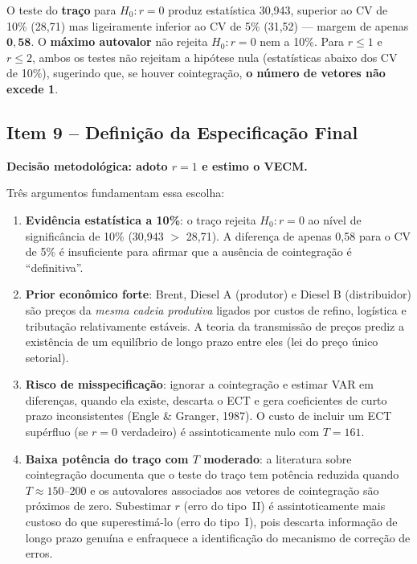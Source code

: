 \documentclass[12pt,a4paper]{article}
\begin{document}
\noindent
O teste do \textbf{traço} para $H_0: r = 0$ produz estatística 30,943,
superior ao CV de 10\% (28,71) mas ligeiramente inferior ao CV de 5\%
(31,52) --- margem de apenas $\mathbf{0{,}58}$.
O \textbf{máximo autovalor} não rejeita $H_0: r = 0$ nem a 10\%.
Para $r \le 1$ e $r \le 2$, ambos os testes não rejeitam a hipótese nula
(estatísticas abaixo dos CV de 10\%), sugerindo que, se houver cointegração,
\textbf{o número de vetores não excede 1}.

\subsection{Item 9 -- Definição da Especificação Final}

\textbf{Decisão metodológica: adoto $r = 1$ e estimo o VECM.}

\medskip\noindent
Três argumentos fundamentam essa escolha:
\begin{enumerate}
  \item \textbf{Evidência estatística a 10\%}: o traço rejeita $H_0: r = 0$
        ao nível de significância de 10\% (30,943 $>$ 28,71).
        A diferença de apenas 0,58 para o CV de 5\% é insuficiente para
        afirmar que a ausência de cointegração é ``definitiva''.
  \item \textbf{Prior econômico forte}: Brent, Diesel A (produtor) e Diesel B
        (distribuidor) são preços da \emph{mesma cadeia produtiva} ligados por
        custos de refino, logística e tributação relativamente estáveis.
        A teoria da transmissão de preços prediz a existência de um equilíbrio
        de longo prazo entre eles (lei do preço único setorial).
  \item \textbf{Risco de misspecificação}: ignorar a cointegração e estimar
        VAR em diferenças, quando ela existe, descarta o ECT e gera
        coeficientes de curto prazo inconsistentes (Engle \& Granger, 1987).
        O custo de incluir um ECT supérfluo (se $r = 0$ verdadeiro) é
        assintoticamente nulo com $T = 161$.
  \item \textbf{Baixa potência do traço com $T$ moderado}: a literatura
        sobre cointegração documenta que o teste do traço tem potência
        reduzida quando $T \approx 150$--$200$ e os autovalores associados
        aos vetores de cointegração são próximos de zero.
        Subestimar $r$ (erro do tipo~II) é assintoticamente mais custoso
        do que superestimá-lo (erro do tipo~I), pois descarta
        informação de longo prazo genuína e enfraquece a identificação
        do mecanismo de correção de erros.
\end{enumerate}
\end{document}
